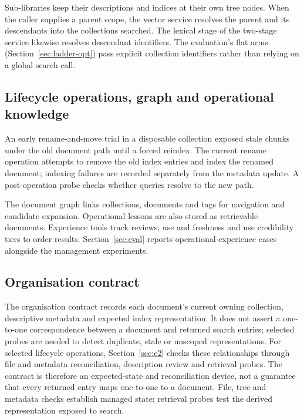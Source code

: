 Sub-libraries keep their descriptions and indices at their own tree nodes.
When the caller supplies a parent scope, the vector service resolves the
parent and its descendants into the collections searched. The lexical stage
of the two-stage service likewise resolves descendant identifiers. The
evaluation's flat arms (Section~\ref{sec:ladder-opt}) pass explicit collection identifiers rather than relying on a global
search call.

\subsection{Lifecycle operations, graph and operational knowledge}
\label{sec:org-lifecycle}
\label{sec:org-graph}
\label{sec:org-experience}

An early rename-and-move trial in a disposable collection exposed stale
chunks under the old document path until a forced reindex. The current rename
operation attempts to remove the old index entries and index the renamed
document; indexing failures are recorded separately from the metadata update.
A post-operation probe checks whether queries resolve to the new path.

The document graph links collections, documents and tags for navigation and
candidate expansion. Operational lessons are also stored as retrievable
documents. Experience tools track reviews, use and freshness and use
credibility tiers to order results. Section~\ref{sec:eval} reports
operational-experience cases alongside the management experiments.

\subsection{Organisation contract}
\label{sec:org-integrity}
\label{sec:org-summary}

The organisation contract records each document's current owning
collection, descriptive metadata and expected index representation. It does
not assert a one-to-one correspondence between a document and returned search
entries; selected probes are needed to detect duplicate, stale or unscoped
representations. For selected lifecycle operations, Section~\ref{sec:e2}
checks these relationships through file and metadata reconciliation,
description review and retrieval probes.
The contract is therefore an expected-state and reconciliation device, not a
guarantee that every returned entry maps one-to-one to a document. File, tree
and metadata checks establish managed state; retrieval probes test the derived
representation exposed to search.
